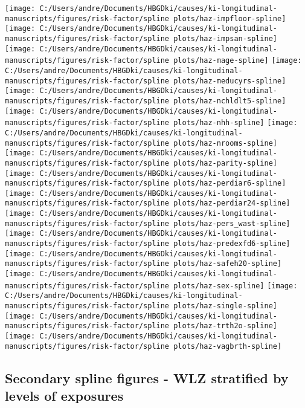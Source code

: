 \documentclass[9pt,]{book}
\begin{document}
\texttt{[image: C:/Users/andre/Documents/HBGDki/causes/ki-longitudinal-manuscripts/figures/risk-factor/spline plots/haz-impfloor-spline]}
\texttt{[image: C:/Users/andre/Documents/HBGDki/causes/ki-longitudinal-manuscripts/figures/risk-factor/spline plots/haz-impsan-spline]}
\texttt{[image: C:/Users/andre/Documents/HBGDki/causes/ki-longitudinal-manuscripts/figures/risk-factor/spline plots/haz-mage-spline]}
\texttt{[image: C:/Users/andre/Documents/HBGDki/causes/ki-longitudinal-manuscripts/figures/risk-factor/spline plots/haz-meducyrs-spline]}
\texttt{[image: C:/Users/andre/Documents/HBGDki/causes/ki-longitudinal-manuscripts/figures/risk-factor/spline plots/haz-nchldlt5-spline]}
\texttt{[image: C:/Users/andre/Documents/HBGDki/causes/ki-longitudinal-manuscripts/figures/risk-factor/spline plots/haz-nhh-spline]}
\texttt{[image: C:/Users/andre/Documents/HBGDki/causes/ki-longitudinal-manuscripts/figures/risk-factor/spline plots/haz-nrooms-spline]}
\texttt{[image: C:/Users/andre/Documents/HBGDki/causes/ki-longitudinal-manuscripts/figures/risk-factor/spline plots/haz-parity-spline]}
\texttt{[image: C:/Users/andre/Documents/HBGDki/causes/ki-longitudinal-manuscripts/figures/risk-factor/spline plots/haz-perdiar6-spline]}
\texttt{[image: C:/Users/andre/Documents/HBGDki/causes/ki-longitudinal-manuscripts/figures/risk-factor/spline plots/haz-perdiar24-spline]}
\texttt{[image: C:/Users/andre/Documents/HBGDki/causes/ki-longitudinal-manuscripts/figures/risk-factor/spline plots/haz-pers\_wast-spline]}
\texttt{[image: C:/Users/andre/Documents/HBGDki/causes/ki-longitudinal-manuscripts/figures/risk-factor/spline plots/haz-predexfd6-spline]}
\texttt{[image: C:/Users/andre/Documents/HBGDki/causes/ki-longitudinal-manuscripts/figures/risk-factor/spline plots/haz-safeh20-spline]}
\texttt{[image: C:/Users/andre/Documents/HBGDki/causes/ki-longitudinal-manuscripts/figures/risk-factor/spline plots/haz-sex-spline]}
\texttt{[image: C:/Users/andre/Documents/HBGDki/causes/ki-longitudinal-manuscripts/figures/risk-factor/spline plots/haz-single-spline]}
\texttt{[image: C:/Users/andre/Documents/HBGDki/causes/ki-longitudinal-manuscripts/figures/risk-factor/spline plots/haz-trth2o-spline]}
\texttt{[image: C:/Users/andre/Documents/HBGDki/causes/ki-longitudinal-manuscripts/figures/risk-factor/spline plots/haz-vagbrth-spline]}

\subsection{Secondary spline figures - WLZ stratified by levels of
exposures}\label{secondary-spline-figures---wlz-stratified-by-levels-of-exposures}
\end{document}
